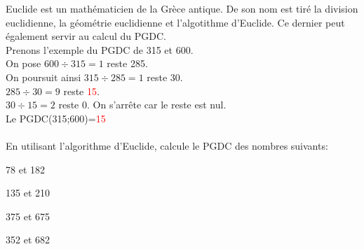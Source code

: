 \begin{exercice}
Euclide est un mathématicien de la Grèce antique. De son nom est tiré la division euclidienne, la géométrie euclidienne et l'algotithme d'Euclide. Ce dernier peut également servir au calcul du PGDC.\\
Prenons l'exemple du PGDC de 315 et 600.\\
On pose $600\div315=1$ reste 285.\\
On poursuit ainsi $315\div285=1$ reste 30.\\
$285\div30=9$ reste \textcolor{red}{15}.\\
$30\div15=2$ reste 0. On s'arrête car le reste est nul.\\
Le PGDC(315;600)=\textcolor{red}{15}
\\
\\
En utilisant l'algorithme d'Euclide, calcule le PGDC des nombres suivants:

\begin{colenumerate}{2}
 \item 78 et 182
 \item 135 et 210
 \item 375 et 675
 \item 352 et 682
\end{colenumerate}
\end{exercice}
